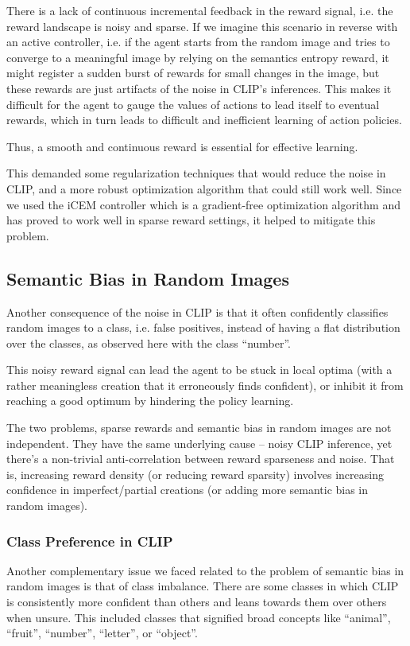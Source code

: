 There is a lack of continuous incremental feedback in the reward signal, i.e. the reward landscape is noisy and sparse.
If we imagine this scenario in reverse with an active controller, i.e. if the agent starts from the random image and tries to converge to a meaningful image by relying on the semantics entropy reward, it might register a sudden burst of rewards for small changes in the image, but these rewards are just artifacts of the noise in CLIP's inferences.
This makes it difficult for the agent to gauge the values of actions to lead itself to eventual rewards, which in turn leads to difficult and inefficient learning of action policies.

Thus, a smooth and continuous reward is essential for effective learning.

This demanded some regularization techniques that would reduce the noise in CLIP, and a more robust optimization algorithm that could still work well.
Since we used the iCEM controller which is a gradient-free optimization algorithm and has proved to work well in sparse reward settings, it helped to mitigate this problem.

\subsection{Semantic Bias in Random Images} %
\label{sec:inference-noise}
Another consequence of the noise in CLIP is that it often confidently classifies random images to a class, i.e. false positives, instead of having a flat distribution over the classes, as observed here with the class ``number''.

This noisy reward signal can lead the agent to be stuck in local optima (with a rather meaningless creation that it erroneously finds confident), or inhibit it from reaching a good optimum by hindering the policy learning.

The two problems, sparse rewards and semantic bias in random images are not independent.
They have the same underlying cause -- noisy CLIP inference, yet there's a non-trivial anti-correlation between reward sparseness and noise.
That is, increasing reward density (or reducing reward sparsity) involves increasing confidence in imperfect/partial creations (or adding more semantic bias in random images).


\subsubsection{Class Preference in CLIP}
\label{sec:class-preference}
Another complementary issue we faced related to the problem of semantic bias in random images is that of class imbalance.
There are some classes in which CLIP is consistently more confident than others and leans towards them over others when unsure.
This included classes that signified broad concepts like ``animal'', ``fruit'', ``number'', ``letter'', or ``object''.

